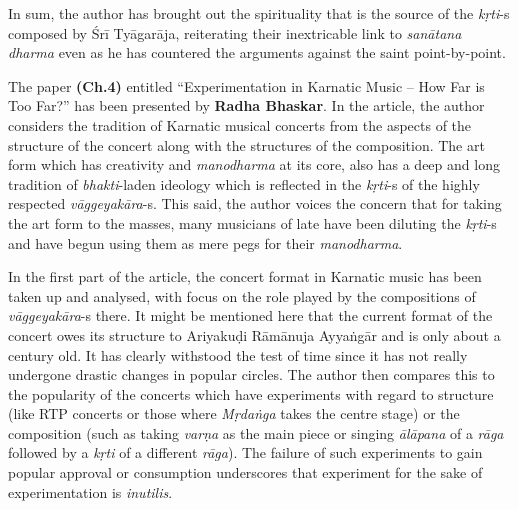 In sum, the author has brought out the spirituality that is the source of the \textit{kṛti}-s composed by Śrī Tyāgarāja, reiterating their inextricable link to \textit{sanātana dharma} even as he has countered the arguments against the saint point-by-point.

The paper \textbf{(Ch.4)} entitled “Experimentation in Karnatic Music – How Far is Too Far?” has been presented by \textbf{Radha Bhaskar}. In the article, the author considers the tradition of Karnatic musical concerts from the aspects of the structure of the concert along with the structures of the composition. The art form which has creativity and \textit{manodharma} at its core, also has a deep and long tradition of \textit{bhakti}-laden ideology which is reflected in the \textit{kṛti}-s of the highly respected \textit{vāggeyakāra}-s. This said, the author voices the concern that for taking the art form to the masses, many musicians of late have been diluting the \textit{kṛti}-s and have begun using them as mere pegs for their \textit{manodharma}.

In the first part of the article, the concert format in Karnatic music has been taken up and analysed, with focus on the role played by the compositions of \textit{vāggeyakāra}-s there. It might be mentioned here that the current format of the concert owes its structure to Ariyakuḍi Rāmānuja Ayyaṅgār and is only about a century old. It has clearly withstood the test of time since it has not really undergone drastic changes in popular circles. The author then compares this to the popularity of the concerts which have experiments with regard to structure (like RTP concerts or those where \textit{Mṛdaṅga} takes the centre stage) or the composition (such as taking \textit{varṇa} as the main piece or singing \textit{ālāpana} of a \textit{rāga} followed by a \textit{kṛti} of a different \textit{rāga}). The failure of such experiments to gain popular approval or consumption underscores that experiment for the sake of experimentation is \textit{inutilis}.

